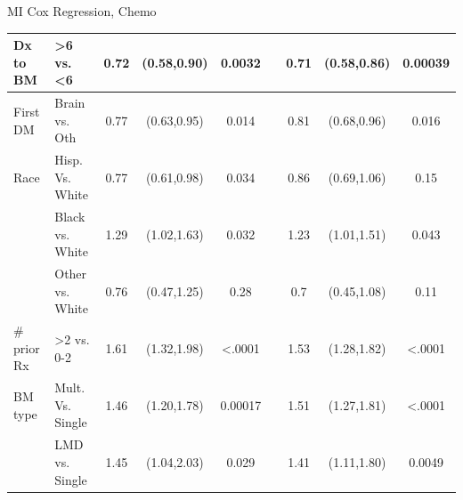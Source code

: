 \begin{frame}{MI Cox Regression, Chemo}
\begin{table}[]
{\begin{tabular}{|l|l|c|c|c|c|c|c|c|}
Dx to BM                       & \textgreater 6 vs. \textless 6   & 0.72                                                & (0.58,0.90)           & 0.0032                &                       & 0.71                  & (0.58,0.86) & 0.00039                                                     \\ \hline
First DM                       & Brain vs. Oth                    & 0.77                                                & (0.63,0.95)           & 0.014                 &                       & 0.81                  & (0.68,0.96) & 0.016                                                       \\ \hline
Race                           & Hisp. Vs. White                  & 0.77                                                & (0.61,0.98)           & 0.034                 &                       & 0.86                  & (0.69,1.06) & 0.15                                                        \\ \hline
                               & Black vs. White                  & 1.29                                                & (1.02,1.63)           & 0.032                 &                       & 1.23                  & (1.01,1.51) & 0.043                                                       \\ \hline
                               & Other vs. White                  & 0.76                                                & (0.47,1.25)           & 0.28                  &                       & 0.7                   & (0.45,1.08) & 0.11                                                        \\ \hline
\# prior Rx                    & \textgreater2 vs. 0-2            & 1.61                                                & (1.32,1.98)           & \textless .0001       &                       & 1.53                  & (1.28,1.82) & \textless .0001                                             \\ \hline
BM type                        & Mult. Vs. Single                 & 1.46                                                & (1.20,1.78)           & 0.00017               &                       & 1.51                  & (1.27,1.81) & \textless .0001                                             \\ \hline
                               & LMD vs. Single                   & 1.45                                                & (1.04,2.03)           & 0.029                 &                       & 1.41                  & (1.11,1.80) & 0.0049                                                      \\ \hline

\end{tabular}}
\end{table}
\end{frame}
